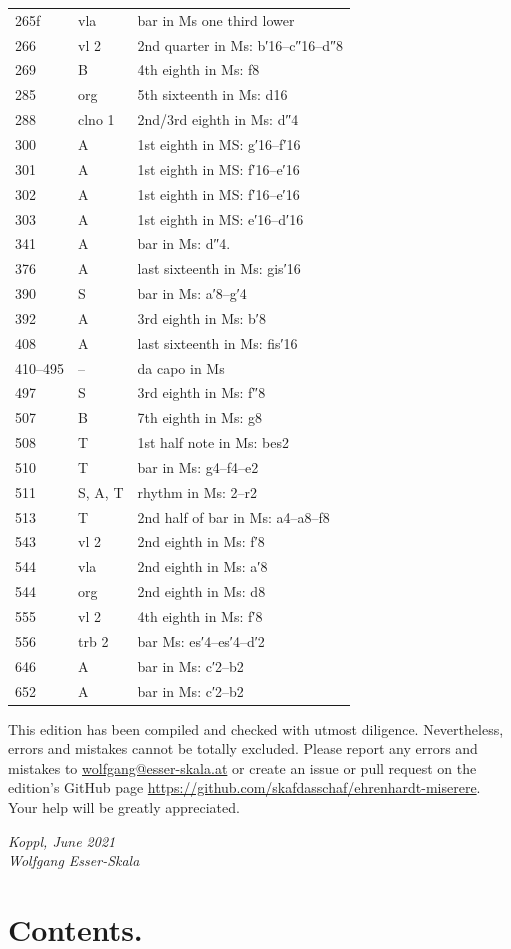 \documentclass[parskip=full]{scrreprt}
\newif\iftemplate\templatetrue
\begin{document}
\begin{longtable}{ll L{10cm}}
  265f & vla    & bar in Ms one third lower \\
  266 & vl 2    & 2nd quarter in Ms: b′16–c″16–d″8 \\
  269 & B       & 4th eighth in Ms: f8 \\
  285 & org     & 5th sixteenth in Ms: d16 \\
  288 & clno 1  & 2nd/3rd eighth in Ms: d″4 \\
  300 & A       & 1st eighth in MS: g′16–f′16 \\
  301 & A       & 1st eighth in MS: f′16–e′16 \\
  302 & A       & 1st eighth in MS: f′16–e′16 \\
  303 & A       & 1st eighth in MS: e′16–d′16 \\
  341 & A       & bar in Ms: d″4. \\
  376 & A       & last sixteenth in Ms: gis′16 \\
  390 & S       & bar in Ms: a′8–g′4 \\
  392 & A       & 3rd eighth in Ms: b′8 \\
  408 & A       & last sixteenth in Ms: fis′16 \\
  410–495 & –   & da capo in Ms \\
  497 & S       & 3rd eighth in Ms: f″8 \\
  507 & B       & 7th eighth in Ms: g8 \\
  508 & T       & 1st half note in Ms: bes2 \\
  510 & T       & bar in Ms: g4–f4–e2 \\
  511 & S, A, T & rhythm in Ms: 2–r2 \\
  513 & T       & 2nd half of bar in Ms: a4–a8–f8 \\
  543 & vl 2    & 2nd eighth in Ms: f′8 \\
  544 & vla     & 2nd eighth in Ms: a′8 \\
  544 & org     & 2nd eighth in Ms: d8 \\
  555 & vl 2    & 4th eighth in Ms: f′8 \\
  556 & trb 2   & bar Ms: es′4–es′4–d′2 \\
  646 & A       & bar in Ms: c′2–b2 \\
  652 & A       & bar in Ms: c′2–b2 \\
  \bottomrule
\end{longtable}


This edition has been compiled and checked with utmost diligence. Nevertheless, errors and mistakes cannot be totally excluded. Please report any errors and mistakes to \url{wolfgang@esser-skala.at} or create an issue or pull request on the edition’s GitHub page \url{https://github.com/skafdasschaf/ehrenhardt-miserere}. Your help will be greatly appreciated.

\bigskip
\textit{Koppl, June 2021\\
Wolfgang Esser-Skala}

\cleardoublepage
\chapter*{Contents.}


\cleardoublepage
\fi

\iftemplate

\fi
\end{document}
